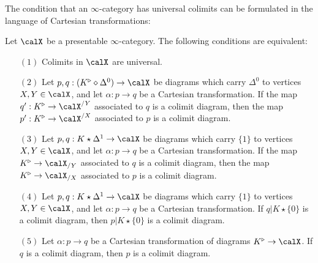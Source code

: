 The condition that an $\infty$-category has universal colimits can be formulated in the language of Cartesian transformations:

\begin{lemma}\label{ib1}
Let $\calX$ be a presentable $\infty$-category. The following conditions are equivalent:
\begin{itemize} 
\item[$(1)$] Colimits in $\calX$ are universal.

\item[$(2)$] Let $p, q: (K^{\triangleright} \diamond \Delta^0)
\rightarrow \calX$ be diagrams which carry $\Delta^0$ to vertices $X, Y \in \calX$, and let
$\alpha: p \rightarrow q$ be a Cartesian transformation. 
If the map $q': K^{\triangleright} \rightarrow \calX^{/Y}$ associated to
$q$ is a colimit diagram, then the map $p': K^{\triangleright} \rightarrow \calX^{/X}$ associated to $p$ is a colimit diagram.

\item[$(3)$] Let $p, q: K \star \Delta^1
\rightarrow \calX$ be diagrams which carry $\{1\}$ to vertices $X, Y \in \calX$, and let
$\alpha: p \rightarrow q$ be a Cartesian transformation. 
If the map $K^{\triangleright} \rightarrow \calX_{/Y}$ associated to
$q$ is a colimit diagram, then the map $K^{\triangleright} \rightarrow \calX_{/X}$ associated to $p$ is a colimit diagram.

\item[$(4)$] Let $p, q: K \star \Delta^1
\rightarrow \calX$ be diagrams which carry $\{1\}$ to vertices $X, Y \in \calX$, and let
$\alpha: p \rightarrow q$ be a Cartesian transformation. 
If $q | K \star \{0\}$ is a colimit diagram, then $p| K \star \{0\}$ is a colimit diagram.

\item[$(5)$] Let $\alpha: p \rightarrow q$ be a Cartesian transformation of diagrams
$K^{\triangleright} \rightarrow \calX$. If $q$ is a colimit diagram, then $p$ is a colimit diagram.
\end{itemize}
\end{lemma}

